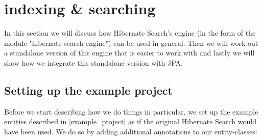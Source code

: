 \section{indexing \& searching}

In this section we will discuss how Hibernate Search's engine (in the form of the module "hibernate-search-engine") can be used in general. Then we will work out a standalone version of this engine that is easier to work with and lastly we will show how we integrate this standalone version with JPA.

\subsection{Setting up the example project}

Before we start describing how we do things in particular, we set up the example entities described in \ref{example_project} as if the original Hibernate Search would have been used. We do so by adding additional annotations to our entity-classes:

